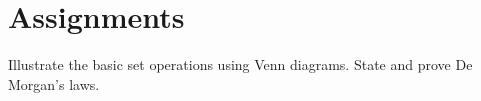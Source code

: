 %

\section{Assignments}

\begin{homework}
\begin{questions}
\question
Illustrate the basic set operations using Venn diagrams.
\question
State and prove De Morgan's laws.
\end{questions}
\end{homework}

\endinput
